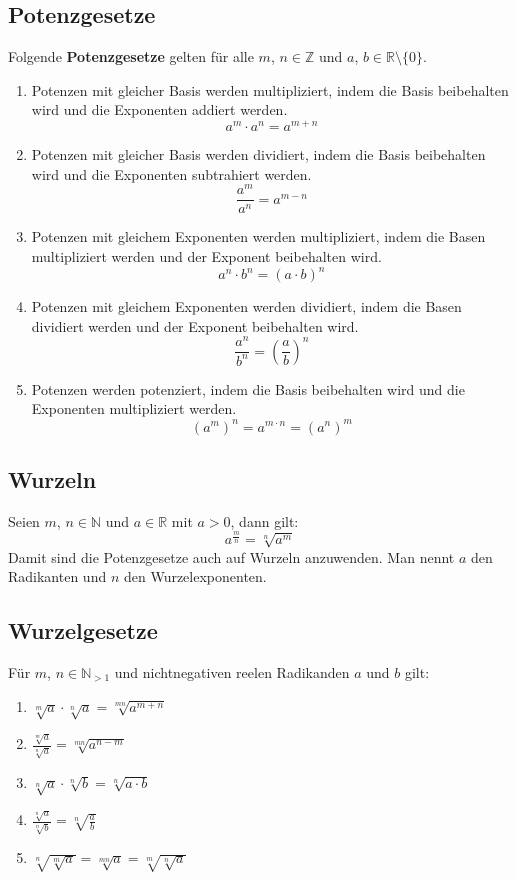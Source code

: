 \subsection{Potenzgesetze}
Folgende \textbf{Potenzgesetze} gelten für alle $ m $, $ n \in \mathbb{Z} $ und $ a$, $ b \in \mathbb{R}\setminus\{0\} $.
\begin{enumerate}
	\item %
		Potenzen mit gleicher Basis werden multipliziert, indem die Basis beibehalten wird und die Exponenten addiert werden.
		\[a^m \cdot a^n = a^{m+n}\]
	\item %
		Potenzen mit gleicher Basis werden dividiert, indem die Basis beibehalten wird und die Exponenten subtrahiert werden.	
		\[\frac{a^m}{a^n} = a^{m-n}\]
	\item %
		Potenzen mit gleichem Exponenten werden multipliziert, indem die Basen multipliziert werden und der Exponent beibehalten wird.
		\[a^n \cdot b^n = (a \cdot b)^n\]
	\item %
		Potenzen mit gleichem Exponenten werden dividiert, indem die Basen dividiert werden und der Exponent beibehalten wird.
		\[\frac{a^n}{b^n} = \left(\frac{a}{b}\right)^n\]
	\item %
		Potenzen werden potenziert, indem die Basis beibehalten wird und die Exponenten multipliziert werden.
		\[(a^m)^n = a^{m \cdot n} = (a^n)^m \]
\end{enumerate}
\subsection{Wurzeln}
Seien $ m $, $ n \in \mathbb{N} $ und $ a \in \mathbb{R} $ mit $ a>0 $, dann gilt:
	\[a^{\frac{m}{n}} = \sqrt[n]{a^m}\]
Damit sind die Potenzgesetze auch auf Wurzeln anzuwenden.
\noindent Man nennt $a$ den Radikanten und $n$ den Wurzelexponenten.
\subsection{Wurzelgesetze}
Für $m$, $n \in \mathbb{N}_{>1}$ und nichtnegativen reelen Radikanden $a$ und $b$ gilt:
\begin{enumerate}
	\item $\sqrt[m]{a}\cdot\sqrt[n]{a} = \sqrt[mn]{a^{m+n}}$
	\item $\frac{\sqrt[m]{a}}{\sqrt[n]{a}} = \sqrt[mn]{a^{n-m}}$
	\item $\sqrt[n]{a}\cdot\sqrt[n]{b} = \sqrt[n]{a\cdot b}$
	\item $\frac{\sqrt[n]{a}}{\sqrt[n]{b}} = \sqrt[n]{\frac{a}{b}}$
	\item $\sqrt[n]{\sqrt[m]{a}} = \sqrt[mn]{a} = \sqrt[m]{\sqrt[n]{a}}$
\end{enumerate} 

